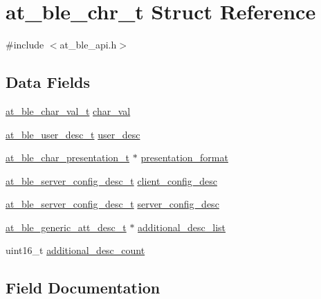 \hypertarget{structat__ble__chr__t}{}\section{at\+\_\+ble\+\_\+chr\+\_\+t Struct Reference}
\label{structat__ble__chr__t}


{\ttfamily \#include $<$at\+\_\+ble\+\_\+api.\+h$>$}

\subsection*{Data Fields}
\begin{DoxyCompactItemize}
\item 
\mbox{\hyperlink{structat__ble__char__val__t}{at\+\_\+ble\+\_\+char\+\_\+val\+\_\+t}} \mbox{\hyperlink{structat__ble__chr__t_a4c759424b3f047850343c1d8264fe5a4}{char\+\_\+val}}
\item 
\mbox{\hyperlink{structat__ble__user__desc__t}{at\+\_\+ble\+\_\+user\+\_\+desc\+\_\+t}} \mbox{\hyperlink{structat__ble__chr__t_aa5f716c0c5eb03aba5fe0c7eb5f097b0}{user\+\_\+desc}}
\item 
\mbox{\hyperlink{structat__ble__char__presentation__t}{at\+\_\+ble\+\_\+char\+\_\+presentation\+\_\+t}} $\ast$ \mbox{\hyperlink{structat__ble__chr__t_a6309826fe45ca7d0688ead29f7ae01a2}{presentation\+\_\+format}}
\item 
\mbox{\hyperlink{structat__ble__server__config__desc__t}{at\+\_\+ble\+\_\+server\+\_\+config\+\_\+desc\+\_\+t}} \mbox{\hyperlink{structat__ble__chr__t_a990049f9e3e094e466ec870e5385ab57}{client\+\_\+config\+\_\+desc}}
\item 
\mbox{\hyperlink{structat__ble__server__config__desc__t}{at\+\_\+ble\+\_\+server\+\_\+config\+\_\+desc\+\_\+t}} \mbox{\hyperlink{structat__ble__chr__t_a86841983968e9b128b405a07b1d561f0}{server\+\_\+config\+\_\+desc}}
\item 
\mbox{\hyperlink{structat__ble__generic__att__desc__t}{at\+\_\+ble\+\_\+generic\+\_\+att\+\_\+desc\+\_\+t}} $\ast$ \mbox{\hyperlink{structat__ble__chr__t_a5557b3c83aed820e5d9e6d41fef8efa1}{additional\+\_\+desc\+\_\+list}}
\item 
uint16\+\_\+t \mbox{\hyperlink{structat__ble__chr__t_a66dcdb596ae4e053bcee9f02bb8fbeb3}{additional\+\_\+desc\+\_\+count}}
\end{DoxyCompactItemize}


\subsection{Field Documentation}
\mbox{\label{structat__ble__chr__t_a66dcdb596ae4e053bcee9f02bb8fbeb3}} 
